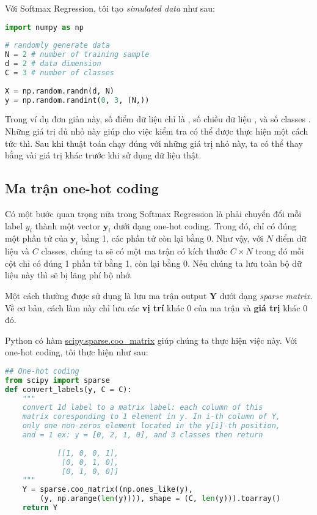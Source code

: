 Với Softmax Regression, tôi tạo \textit{simulated data} như sau:  
 
\begin{lstlisting}[language=Python]
import numpy as np  
 
# randomly generate data  
N = 2 # number of training sample  
d = 2 # data dimension  
C = 3 # number of classes  
 
X = np.random.randn(d, N) 
y = np.random.randint(0, 3, (N,)) 
\end{lstlisting}
Trong ví dụ đơn giản này, số điểm dữ liệu chỉ là , số chiều dữ liệu , và số classes . Những giá trị đủ nhỏ này giúp cho việc kiểm tra có thể được thực hiện một cách tức thì. Sau khi thuật toán chạy đúng với những giá trị nhỏ này, ta có thể thay  bằng vài giá trị khác trước khi sử dụng dữ liệu thật.  
 
 
\subsection{Ma trận one-hot coding }
Có một bước quan trọng nữa trong Softmax Regression là phải chuyển đổi mỗi label $y_i$ thành một vector $\mathbf{y}_i$ dưới dạng one-hot coding. Trong đó, chỉ có đúng một phần tử của $\mathbf{y}_i$ bằng 1, các phần tử còn lại bằng 0. Như vậy, với $N$ điểm dữ liệu và $C$ classes, chúng ta sẽ có một ma trận có kích thước $C \times N$ trong đó mỗi cột chỉ có đúng 1 phần tử bằng 1, còn lại bằng 0. Nếu chúng ta lưu toàn bộ dữ liệu này thì sẽ bị lãng phí bộ nhớ.  
 
Một cách thường được sử dụng là lưu ma trận output $\mathbf{Y}$ dưới dạng \textit{sparse matrix}. Về cơ bản, cách làm này chỉ lưu các \textbf{vị trí} khác 0 của ma trận và \textbf{giá trị} khác 0 đó.  
 
Python có hàm \href{https://docs.scipy.org/doc/scipy/reference/generated/scipy.sparse.coo_matrix.html}{scipy.sparse.coo\_matrix} giúp chúng ta thực hiện việc này. Với one-hot coding, tôi thực hiện như sau:  
 
\begin{lstlisting}[language=Python]
## One-hot coding 
from scipy import sparse  
def convert_labels(y, C = C): 
    """ 
    convert 1d label to a matrix label: each column of this  
    matrix coresponding to 1 element in y. In i-th column of Y,  
    only one non-zeros element located in the y[i]-th position,  
    and = 1 ex: y = [0, 2, 1, 0], and 3 classes then return 
 
            [[1, 0, 0, 1], 
             [0, 0, 1, 0], 
             [0, 1, 0, 0]] 
    """ 
    Y = sparse.coo_matrix((np.ones_like(y),  
        (y, np.arange(len(y)))), shape = (C, len(y))).toarray() 
    return Y  
\end{lstlisting}
 
